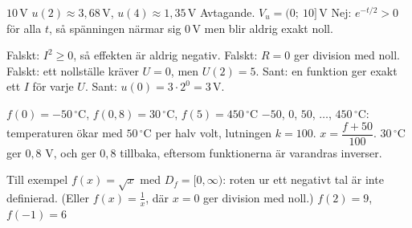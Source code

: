 \begin{facit}
  $10\,\text{V}$  $u(2) \approx 3{,}68\,\text{V}$,
$u(4) \approx 1{,}35\,\text{V}$  Avtagande.  $V_u = (0;\ 10]\,\text{V}$
 Nej: $e^{-t/2} > 0$ för alla $t$, så spänningen närmar sig $0\,\text{V}$ men blir aldrig
exakt noll.

  Falskt: $I^2 \geq 0$, så effekten är aldrig negativ.
 Falskt: $R = 0$ ger division med noll.
 Falskt: ett nollställe kräver $U = 0$, men $U(2) = 5$.
 Sant: en funktion ger exakt ett $I$ för varje $U$.
 Sant: $u(0) = 3 \cdot 2^0 = 3\,\text{V}$.

  $f(0) = -50\,^{\circ}$C, $f(0{,}8) = 30\,^{\circ}$C,
$f(5) = 450\,^{\circ}$C
 $-50$, $0$, $50$, $\ldots$, $450\,^{\circ}$C: temperaturen ökar med $50\,^{\circ}$C per
halv volt, lutningen $k = 100$.
 $x = \dfrac{f + 50}{100}$. $30\,^{\circ}$C ger $0{,}8$ V, och
 ger $0{,}8$ tillbaka, eftersom funktionerna är varandras
inverser.

  Till exempel $f(x) = \sqrt{x}$ med $D_f = [0, \infty)$: roten ur
ett negativt tal är inte definierad. (Eller $f(x) = \frac{1}{x}$, där $x = 0$ ger division med
noll.)
 $f(2) = 9$, $f(-1) = 6$

\end{facit}
